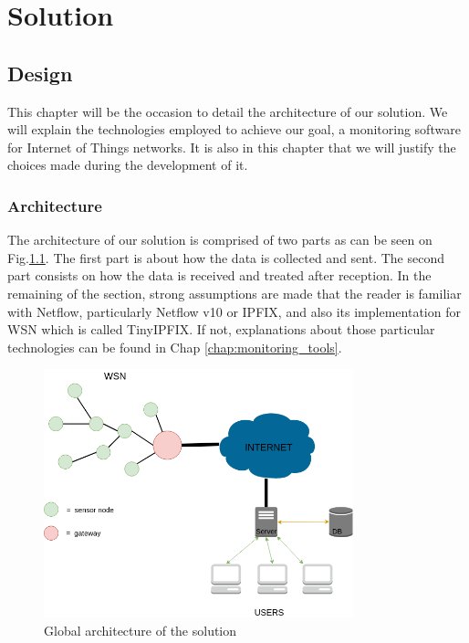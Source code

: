 \part{Solution} \label{part:solution}

\chapter{Design}

This chapter will be the occasion to detail the architecture of our solution. We will explain the technologies employed to achieve our goal, a monitoring software for Internet of Things networks. It is also in this chapter that we will justify the choices made during the development of it.

\section{Architecture}

The architecture of our solution is comprised of two parts as can be seen on Fig.\ref{fig:design}. The first part is about how the data is collected and sent. The second part consists on how the data is received and treated after reception. In the remaining of the section, strong assumptions are made that the reader is familiar with Netflow, particularly Netflow v10 or IPFIX, and also its implementation for WSN which is called TinyIPFIX. If not, explanations about those particular technologies can be found in Chap \ref{chap:monitoring_tools}. \\

\begin{figure}
	\centering
	\includegraphics[width=0.8\textwidth]{res/design.png}
	\caption{Global architecture of the solution}
	\label{fig:design}
\end{figure}

